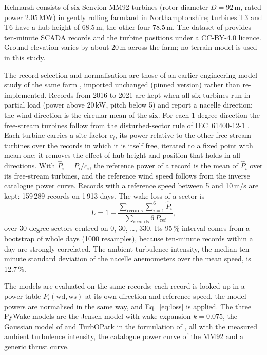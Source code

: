 \documentclass[11pt,a4paper]{article}
\begin{document}
Kelmarsh consists of six Senvion MM92 turbines (rotor diameter $D = 92$\,m, rated power 2.05\,MW) in
gently rolling farmland in Northamptonshire; turbines T3 and T6 have a hub height of 68.5\,m, the other four
78.5\,m. The dataset of \citet{plumley2025kelmarsh} provides ten-minute SCADA records and the turbine positions
under a CC-BY-4.0 licence. Ground elevation varies by about 20\,m across the farm; no terrain model is used in
this study.

The record selection and normalisation are those of an earlier engineering-model study of the same farm
\citep{waleszczynski2026wakeshadow}, imported unchanged (pinned version) rather than re-implemented. Records from
2016 to 2021 are kept when all six turbines run in partial load (power above 20\,kW, pitch below 5\textdegree) and
report a nacelle direction; the wind direction is the circular mean of the six. For each 1-degree direction the
free-stream turbines follow from the disturbed-sector rule of IEC~61400-12-1 \citep{iec61400121}. Each turbine
carries a site factor $c_i$, its power relative to the other free-stream turbines over the records in which it is
itself free, iterated to a fixed point with mean one; it removes the effect of hub height and position that holds
in all directions. With $\hat P_i = P_i / c_i$, the reference power of a record is the mean of $\hat P_i$ over its
free-stream turbines, and the reference wind speed follows from the inverse catalogue power curve. Records with a
reference speed between 5 and 10\,m/s are kept: 159\,289 records on 1\,913 days. The wake loss of a sector is
\begin{equation}
  L = 1 - \frac{\sum_{\mathrm{records}} \sum_{i=1}^{6} \hat P_i}{\sum_{\mathrm{records}} 6\, P_{\mathrm{ref}}} ,
  \label{eq:loss}
\end{equation}
over 30-degree sectors centred on 0, 30, \ldots, 330\textdegree. Its 95\,\% interval comes from a bootstrap of
whole days (1000 resamples), because ten-minute records within a day are strongly correlated. The ambient
turbulence intensity, the median ten-minute standard deviation of the nacelle anemometers over the mean speed,
is 12.7\,\%.

The models are evaluated on the same records: each record is looked up in a power table
$P_i(\mathrm{wd}, \mathrm{ws})$ at its own direction and reference speed, the model powers are normalised in the
same way, and Eq.~\eqref{eq:loss} is applied. The three PyWake models are the Jensen model with wake expansion
$k = 0.075$, the Gaussian model of \citet{niayifar2016analytical} and TurbOPark in the formulation of
\citet{pedersen2022turbopark}, all with the measured ambient turbulence intensity, the catalogue power curve of the
MM92 \citep{haas2024windpowerlib} and a generic thrust curve.
\end{document}
